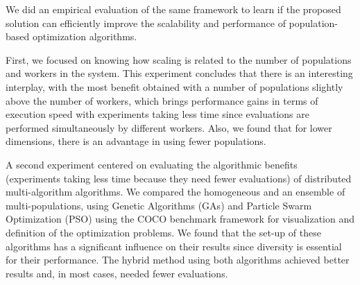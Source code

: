 \documentclass[review]{elsarticle}
\begin{document}
We did an empirical evaluation of the same framework to learn if the proposed
solution can efficiently improve the scalability and performance of
population-based optimization algorithms.

First, we focused on knowing how scaling is related to the number of populations
and workers in the system. This experiment concludes that there is an
interesting interplay, with the most benefit obtained with a number of
populations slightly above the number of workers, which brings performance gains 
in terms of execution speed with experiments taking less time since
evaluations are performed simultaneously by different workers.
Also, we found that for lower dimensions, there is an advantage in using fewer
populations. %

A second experiment centered on evaluating the algorithmic benefits (experiments
taking less time because they need fewer evaluations) of distributed
multi-algorithm algorithms. We compared the homogeneous and an ensemble of
multi-populations, using Genetic Algorithms (GAs) and Particle Swarm
Optimization (PSO) using the COCO benchmark framework 
for visualization and definition of the optimization problems.
We found that the set-up of these algorithms has a significant influence on
their results since diversity is essential for their performance. The
hybrid method using both algorithms 
achieved better results and, in most cases, needed fewer evaluations.



\end{document}
